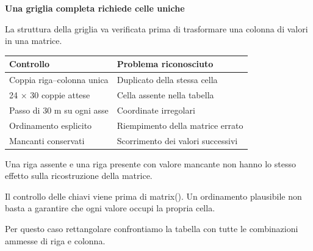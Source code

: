 \documentclass[12pt,aspectratio=1610]{beamer}
\newcommand{\PBody}[1]{\par{\fontsize{11.3}{14.8}\selectfont #1\par}}
\newcommand{\PSmall}[1]{\par{\fontsize{9.8}{13.1}\selectfont #1\par}}
\newcommand{\PInfo}[1]{%
\begin{tcolorbox}[enhanced,arc=1.6mm,boxrule=.55pt,colback=GeoTint,
 colframe=Rule!80!Classical,left=2.3mm,right=2.3mm,top=2mm,bottom=2mm,
 before skip=1mm,after skip=1mm]
\PSmall{#1}\end{tcolorbox}}
\begin{document}
\begin{frame}[plain]\hypertarget{slide12}{}
\begin{lrbox}{\TitleBox}
\begin{minipage}[t]{17.7cm}\raggedright\color{Ink}\fontsize{11.3}{14.8}\selectfont
\color{Navy}\bfseries\fontsize{20.6}{24.5}\selectfont Una griglia completa richiede celle uniche
\end{minipage}\end{lrbox}

\begin{lrbox}{\RecallBox}
\begin{minipage}[t]{14.3cm}\raggedright\color{Ink}\fontsize{11.3}{14.8}\selectfont
\fontsize{10.3}{13.8}\selectfont La struttura della griglia va verificata prima di trasformare una colonna di valori in una matrice.
\end{minipage}\end{lrbox}

\begin{lrbox}{\PilotLeftBox}
\begin{minipage}[t]{10.05cm}\raggedright\color{Ink}\fontsize{11.3}{14.8}\selectfont
{\fontsize{10.2}{13.1}\selectfont\renewcommand{\arraystretch}{1.45}\begin{tabular}{@{}p{4.3cm}p{4.7cm}@{}}\toprule
\textbf{Controllo} & \textbf{Problema riconosciuto}\\\midrule
Coppia riga–colonna unica & Duplicato della stessa cella\\
24 × 30 coppie attese & Cella assente nella tabella\\
Passo di 30 m su ogni asse & Coordinate irregolari\\
Ordinamento esplicito & Riempimento della matrice errato\\
Mancanti conservati & Scorrimento dei valori successivi\\
\bottomrule\end{tabular}}

\end{minipage}\end{lrbox}

\begin{lrbox}{\PilotRightBox}
\begin{minipage}[t]{7.55cm}\raggedright\color{Ink}\fontsize{11.3}{14.8}\selectfont
\PBody{Una riga assente e una riga presente con valore mancante non hanno lo stesso effetto sulla ricostruzione della matrice.}
\vspace{2.5mm}
\PInfo{Il controllo delle chiavi viene prima di matrix(). Un ordinamento plausibile non basta a garantire che ogni valore occupi la propria cella.}
\PBody{Per questo caso rettangolare confrontiamo la tabella con tutte le combinazioni ammesse di riga e colonna.}
\vspace{2.5mm}


\end{minipage}
\end{lrbox}
\end{frame}
\end{document}

